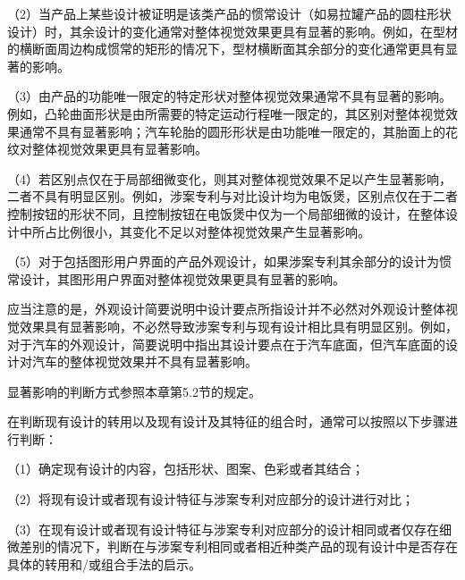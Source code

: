 {\setlength{\parindent}{17.1bp}（2）当产品上某些设计被证明是该类产品的惯常设计（如易拉罐产品的圆柱形状设计）时，其余设计的变化通常对整体视觉效果更具有显著的影响。例如，在型材的横断面周边构成惯常的矩形的情况下，型材横断面其余部分的变化通常更具有显著的影响。\par}

{\setlength{\parindent}{17.1bp}（3）由产品的功能唯一限定的特定形状对整体视觉效果通常不具有显著的影响。例如，凸轮曲面形状是由所需要的特定运动行程唯一限定的，其区别对整体视觉效果通常不具有显著影响；汽车轮胎的圆形形状是由功能唯一限定的，其胎面上的花纹对整体视觉效果更具有显著影响。\par}

{\setlength{\parindent}{17.1bp}（4）若区别点仅在于局部细微变化，则其对整体视觉效果不足以产生显著影响，二者不具有明显区别。例如，涉案专利与对比设计均为电饭煲，区别点仅在于二者控制按钮的形状不同，且控制按钮在电饭煲中仅为一个局部细微的设计，在整体设计中所占比例很小，其变化不足以对整体视觉效果产生显著影响。\par}

{\setlength{\parindent}{17.1bp}（5）对于包括图形用户界面的产品外观设计，如果涉案专利其余部分的设计为惯常设计，其图形用户界面对整体视觉效果更具有显著的影响。\par}

应当注意的是，外观设计简要说明中设计要点所指设计并不必然对外观设计整体视觉效果具有显著影响，不必然导致涉案专利与现有设计相比具有明显区别。例如，对于汽车的外观设计，简要说明中指出其设计要点在于汽车底面，但汽车底面的设计对汽车的整体视觉效果并不具有显著影响。

显著影响的判断方式参照本章第5.2节的规定。

在判断现有设计的转用以及现有设计及其特征的组合时，通常可以按照以下步骤进行判断：

{\setlength{\parindent}{17.1bp}（1）确定现有设计的内容，包括形状、图案、色彩或者其结合；\par}

{\setlength{\parindent}{17.1bp}（2）将现有设计或者现有设计特征与涉案专利对应部分的设计进行对比；\par}

{\setlength{\parindent}{17.1bp}（3）在现有设计或者现有设计特征与涉案专利对应部分的设计相同或者仅存在细微差别的情况下，判断在与涉案专利相同或者相近种类产品的现有设计中是否存在具体的转用和/或组合手法的启示。\par}

